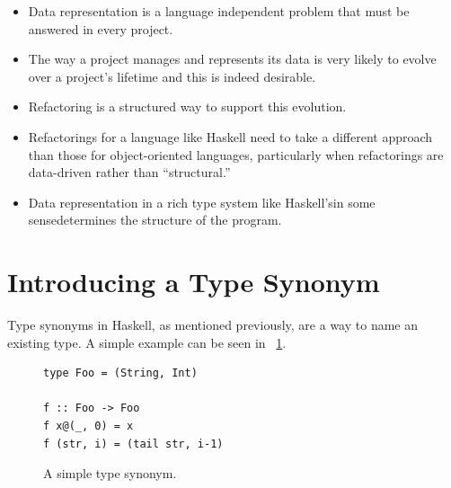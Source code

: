 \begin{itemize}
	\item Data representation is a language independent problem that must be answered in every project.
	\item The way a project manages and represents its data is very likely to evolve over a project's lifetime and this is indeed desirable.
	\item Refactoring is a structured way to support this evolution.
		\item Refactorings for a language like Haskell need to take a different approach than those for object-oriented languages, particularly when refactorings are data-driven rather than ``structural.''  
	\item Data representation in a rich type system like Haskell's\DIFaddbegin \DIFadd{, }\DIFaddend in some sense\DIFaddbegin \DIFadd{, }\DIFaddend determines the structure of the program.
\end{itemize} 

\DIFdelbegin %
\DIFdelend \DIFaddbegin \section{Introducing a Type Synonym}\DIFaddend \label{introSyn}

Type synonyms in Haskell, as mentioned previously, are a way to name an existing type. A simple example can be seen in \DIFdelbegin {}\DIFdelend \DIFaddbegin {}\DIFaddend ~\ref{fooSyn}. 

\begin{figure}[t]
	\DIFdelbeginFL %

\DIFdelendFL \DIFaddbeginFL \begin{lstlisting}
type Foo = (String, Int)

f :: Foo -> Foo
f x@(_, 0) = x
f (str, i) = (tail str, i-1) 
	\end{lstlisting}
	\DIFaddendFL \caption{A simple type synonym.}\DIFaddbeginFL \label{fooSyn}
\DIFaddendFL \end{figure}

